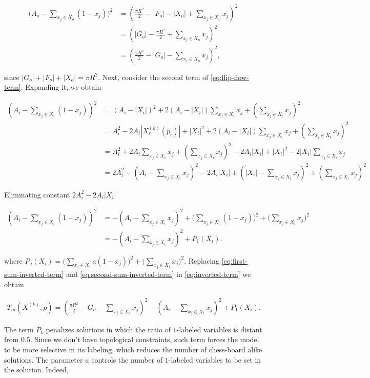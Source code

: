 \begin{align}
	\big( A_o - \sum_{x_j \in X_o}{(1-x_j)}\big)^2 &= (\frac{\pi R^2}{2} - |F_o| - |X_o| + \sum_{x_j \in X_o}{x_j})^2 \nonumber \\
	&= 	( |G_o| - \frac{\pi R^2}{2} + \sum_{x_j \in X_o}{x_j})^2 \nonumber \\
	&= (\frac{\pi R^2}{2} - |G_o| - \sum_{x_j \in X_o}{x_j})^2,
	\label{eq:first-sum-inverted-term}
\end{align}

since $|G_o|+|F_o|+|X_o| = \pi R^2$. Next, consider the second term of \eqref{eq:flip-flow-term}. Expanding it, we obtain

\begin{align*}
	(A_i - \sum_{x_j \in X_i}{(1-x_j)})^2 &= (A_i - |X_i|)^2 + 2(A_i-|X_i|)\sum_{x_j \in X_i}{x_j} + ( \sum_{x_j \in X_i}{x_j} )^2  \\
	&= A_i^2 -2A_i|X_r^{(k)}(p_i)| + |X_i|^2 + 2(A_i - |X_i|)\sum_{x_j \in X_i}{x_j} + (\sum_{x_j \in X_i}{x_j})^2  \\
	&= A_i^2 + 2A_i\sum_{x_j \in X_i}{x_j} + (\sum_{x_j \in X_i}{x_j})^2 - 2A_i|X_i| + |X_i|^2 - 2|X_i|\sum_{x_j \in X_i}{x_j} \\
	&= 2A_i^2 - (A_i - \sum_{x_j \in X_i}{x_j})^2 -2A_i|X_i| + (|X_i| - \sum_{x_j \in X_i}{x_j})^2 + (\sum_{x_j \in X_i}{x_j})^2
\end{align*}

Eliminating constant $2A_i^2 - 2A_i|X_i|$
	
\begin{align}
	(A_i - \sum_{x_j \in X_i}{(1-x_j)})^2 &= - (A_i - \sum_{x_j \in X_i}{x_j})^2 + \Big( \sum_{x_j \in X_i}{(1-x_j)} \Big)^2 + \Big(\sum_{x_j \in X_i}{x_j}\Big)^2 \nonumber \\
	&= - (A_i - \sum_{x_j \in X_i}{x_j})^2 + P_1(X_i).
	\label{eq:second-sum-inverted-term}
\end{align}

where  $P_a(X_i)=\Big( \sum_{x_j \in X_i}{a(1-x_j)} \Big)^2 + \Big(\sum_{x_j \in X_i}{x_j}\Big)^2$. Replacing \eqref{eq:first-sum-inverted-term} and \eqref{eq:second-sum-inverted-term}  in \eqref{eq:inverted-term} we obtain

\begin{align}
	T_m(X^{(k)},p) = (\frac{\pi R^2}{2} - G_o - \sum_{x_j \in X_o}{x_j})^2 - (A_i - \sum_{x_j \in X_i}{x_j})^2 + P_1(X_i).
\end{align}

The term $P_1$ penalizes solutions in which the ratio of $1$-labeled variables is distant from $0.5$. Since we don't have topological constraints, such term forces the model to be more selective in its labeling, which reduces the number of chess-board alike solutions. The parameter $a$ controls the number of $1$-labeled variables to be set in the solution. Indeed,


